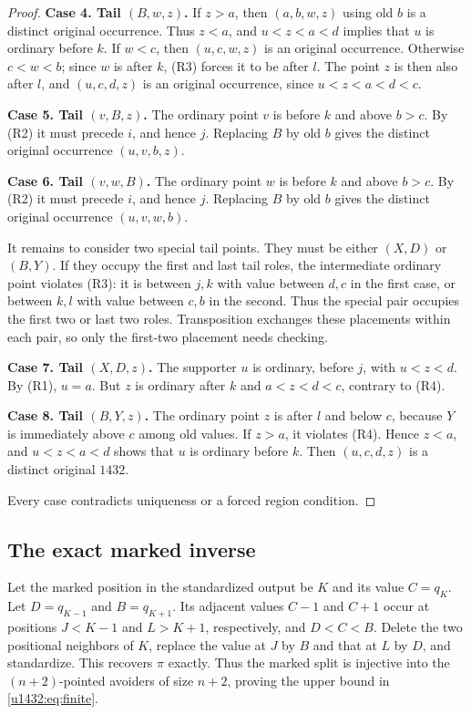 \documentclass[11pt]{article}
\theoremstyle{remark}\newtheorem{remark}[theorem]{Remark}
\begin{document}
\begin{proof}
\medskip\noindent\textbf{Case 4. Tail $(B,w,z)$.}
If $z>a$, then $(a,b,w,z)$ using old $b$ is a distinct original
occurrence. Thus $z<a$, and $u<z<a<d$ implies that $u$ is ordinary
before $k$. If $w<c$, then $(u,c,w,z)$ is an original occurrence.
Otherwise $c<w<b$; since $w$ is after $k$, (R3) forces it to be after
$l$. The point $z$ is then also after $l$, and $(u,c,d,z)$ is an
original occurrence, since $u<z<a<d<c$.

\medskip\noindent\textbf{Case 5. Tail $(v,B,z)$.}
The ordinary point $v$ is before $k$ and above $b>c$. By (R2) it must
precede $i$, and hence $j$. Replacing $B$ by old $b$ gives the distinct
original occurrence $(u,v,b,z)$.

\medskip\noindent\textbf{Case 6. Tail $(v,w,B)$.}
The ordinary point $w$ is before $k$ and above $b>c$. By (R2) it must
precede $i$, and hence $j$. Replacing $B$ by old $b$ gives the distinct
original occurrence $(u,v,w,b)$.

\medskip
It remains to consider two special tail points. They must be either
$(X,D)$ or $(B,Y)$. If they occupy the first and last tail roles, the
intermediate ordinary point violates (R3): it is between $j,k$ with
value between $d,c$ in the first case, or between $k,l$ with value
between $c,b$ in the second. Thus the special pair occupies the first
two or last two roles. Transposition exchanges these placements within
each pair, so only the first-two placement needs checking.

\medskip\noindent\textbf{Case 7. Tail $(X,D,z)$.}
The supporter $u$ is ordinary, before $j$, with $u<z<d$. By (R1),
$u=a$. But $z$ is ordinary after $k$ and $a<z<d<c$, contrary to (R4).

\medskip\noindent\textbf{Case 8. Tail $(B,Y,z)$.}
The ordinary point $z$ is after $l$ and below $c$, because $Y$ is
immediately above $c$ among old values. If $z>a$, it violates (R4).
Hence $z<a$, and $u<z<a<d$ shows that $u$ is ordinary before $k$.
Then $(u,c,d,z)$ is a distinct original $1432$.

Every case contradicts uniqueness or a forced region condition.
\end{proof}

\subsection{The exact marked inverse}
Let the marked position in the standardized output be $K$ and its value
$C=q_K$. Let $D=q_{K-1}$ and $B=q_{K+1}$. Its adjacent values $C-1$ and
$C+1$ occur at positions $J<K-1$ and $L>K+1$, respectively, and
$D<C<B$. Delete the two positional neighbors of $K$, replace the value
at $J$ by $B$ and that at $L$ by $D$, and standardize. This recovers
$\pi$ exactly. Thus the marked split is injective into the $(n+2)$-pointed
avoiders of size $n+2$, proving the upper bound in \eqref{u1432:eq:finite}.
\end{document}
